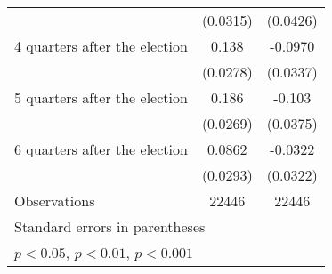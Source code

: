 \begin{table}[htbp]
\begin{tabular}{l*{2}{c}}
                    &    (0.0315)         &    (0.0426)         \\
[1em]
 4 quarters after the election&       0.138\sym{***}&     -0.0970\sym{**} \\
                    &    (0.0278)         &    (0.0337)         \\
[1em]
 5 quarters after the election&       0.186\sym{***}&      -0.103\sym{**} \\
                    &    (0.0269)         &    (0.0375)         \\
[1em]
 6 quarters after the election&      0.0862\sym{**} &     -0.0322         \\
                    &    (0.0293)         &    (0.0322)         \\
\hline
Observations        &       22446         &       22446         \\
\hline\hline
\multicolumn{3}{l}{\footnotesize Standard errors in parentheses}\\
\multicolumn{3}{l}{\footnotesize \sym{*} \(p<0.05\), \sym{**} \(p<0.01\), \sym{***} \(p<0.001\)}\\
\end{tabular}
\end{table}
